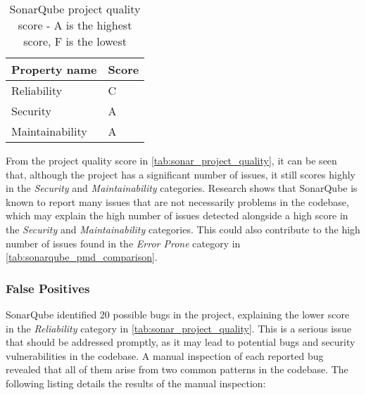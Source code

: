 \begin{table}[H]
	\label{tab:sonar_project_quality}
	\begin{center}
		\begin{tabular}[c]{l|l}
			\hline
			\multicolumn{1}{c|}{\textbf{Property name}} &
			\multicolumn{1}{c}{\textbf{Score}}              \\
			\hline
			Reliability                                 & C \\
			Security                                    & A \\
			Maintainability                             & A \\
			\hline
		\end{tabular}
	\end{center}
	\caption{SonarQube project quality score - A is the highest score, F is the lowest}
\end{table}

\noindent From the project quality score in \autoref{tab:sonar_project_quality}, it can be seen that, although the project has a significant number of issues, it still scores highly in the \textit{Security} and \textit{Maintainability} categories. Research shows that SonarQube is known to report many issues that are not necessarily problems in the codebase, which may explain the high number of issues detected alongside a high score in the \textit{Security} and \textit{Maintainability} categories. This could also contribute to the high number of issues found in the \textit{Error Prone} category in \autoref{tab:sonarqube_pmd_comparison}.

\subsubsection{False Positives}

SonarQube identified 20 possible bugs in the project, explaining the lower score in the \textit{Reliability} category in \autoref{tab:sonar_project_quality}. This is a serious issue that should be addressed promptly, as it may lead to potential bugs and security vulnerabilities in the codebase. A manual inspection of each reported bug revealed that all of them arise from two common patterns in the codebase. The following listing details the results of the manual inspection:


